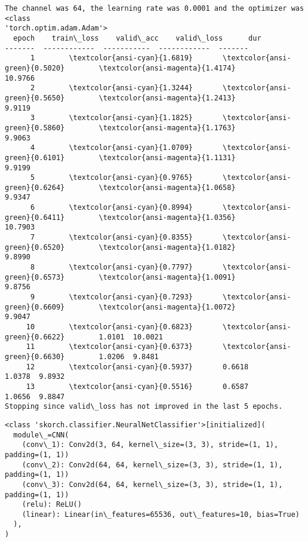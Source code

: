 \documentclass[11pt]{article}
\makeatletter
\newcommand{\boxspacing}{\kern\kvtcb@left@rule\kern\kvtcb@boxsep}
\newcommand{\prompt}[4]{
        \ttfamily\llap{{\color{#2}[#3]:\hspace{3pt}#4}}\vspace{-\baselineskip}
    }
\makeatother
\begin{document}
    \begin{Verbatim}[commandchars=\\\{\}]
The channel was 64, the learning rate was 0.0001 and the optimizer was <class
'torch.optim.adam.Adam'>
  epoch    train\_loss    valid\_acc    valid\_loss      dur
-------  ------------  -----------  ------------  -------
      1        \textcolor{ansi-cyan}{1.6819}       \textcolor{ansi-green}{0.5020}        \textcolor{ansi-magenta}{1.4174}
10.9766
      2        \textcolor{ansi-cyan}{1.3244}       \textcolor{ansi-green}{0.5650}        \textcolor{ansi-magenta}{1.2413}
9.9119
      3        \textcolor{ansi-cyan}{1.1825}       \textcolor{ansi-green}{0.5860}        \textcolor{ansi-magenta}{1.1763}
9.9063
      4        \textcolor{ansi-cyan}{1.0709}       \textcolor{ansi-green}{0.6101}        \textcolor{ansi-magenta}{1.1131}
9.9199
      5        \textcolor{ansi-cyan}{0.9765}       \textcolor{ansi-green}{0.6264}        \textcolor{ansi-magenta}{1.0658}
9.9347
      6        \textcolor{ansi-cyan}{0.8994}       \textcolor{ansi-green}{0.6411}        \textcolor{ansi-magenta}{1.0356}
10.7903
      7        \textcolor{ansi-cyan}{0.8355}       \textcolor{ansi-green}{0.6520}        \textcolor{ansi-magenta}{1.0182}
9.8990
      8        \textcolor{ansi-cyan}{0.7797}       \textcolor{ansi-green}{0.6573}        \textcolor{ansi-magenta}{1.0091}
9.8756
      9        \textcolor{ansi-cyan}{0.7293}       \textcolor{ansi-green}{0.6609}        \textcolor{ansi-magenta}{1.0072}
9.9047
     10        \textcolor{ansi-cyan}{0.6823}       \textcolor{ansi-green}{0.6622}        1.0101  10.0021
     11        \textcolor{ansi-cyan}{0.6373}       \textcolor{ansi-green}{0.6630}        1.0206  9.8481
     12        \textcolor{ansi-cyan}{0.5937}       0.6618        1.0378  9.8932
     13        \textcolor{ansi-cyan}{0.5516}       0.6587        1.0656  9.8847
Stopping since valid\_loss has not improved in the last 5 epochs.
    \end{Verbatim}

            \begin{tcolorbox}[breakable, size=fbox, boxrule=.5pt, pad at break*=1mm, opacityfill=0]
\prompt{Out}{outcolor}{10}{\boxspacing}
\begin{Verbatim}[commandchars=\\\{\}]
<class 'skorch.classifier.NeuralNetClassifier'>[initialized](
  module\_=CNN(
    (conv\_1): Conv2d(3, 64, kernel\_size=(3, 3), stride=(1, 1), padding=(1, 1))
    (conv\_2): Conv2d(64, 64, kernel\_size=(3, 3), stride=(1, 1), padding=(1, 1))
    (conv\_3): Conv2d(64, 64, kernel\_size=(3, 3), stride=(1, 1), padding=(1, 1))
    (relu): ReLU()
    (linear): Linear(in\_features=65536, out\_features=10, bias=True)
  ),
)
\end{Verbatim}
\end{tcolorbox}
        
\end{document}
